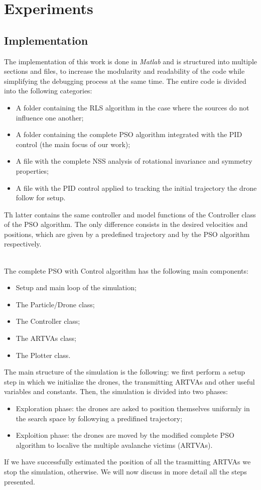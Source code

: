 \chapter{Experiments}

\section{Implementation}
The implementation of this work is done in \textit{Matlab} and 
is structured into multiple sections and files, to increase the modularity and 
readability of the code while simplifying the debugging process at the same time. 
The entire code is divided into the following categories:
\begin{itemize}
    \item A folder containing the RLS algorithm in the case where the sources
    do not influence one another;
    \item A folder containing the complete PSO algorithm integrated with 
    the PID control (the main focus of our work);
    \item A file with the complete NSS analysis of rotational invariance
    and symmetry properties;
    \item A file with the PID control applied to tracking the initial trajectory
    the drone follow for setup.
\end{itemize}
Th latter contains the same controller and model functions of the Controller
class of the PSO algorithm. The only difference consists in the desired velocities and positions, 
which are given by a predefined trajectory and by the PSO algorithm
respectively.

\noindent
\\
The complete PSO with Control algorithm has the following main components: 
\begin{itemize}
    \item Setup and main loop of the simulation;
    \item The Particle/Drone class;
    \item The Controller class;
    \item The ARTVAs class;
    \item The Plotter class.
\end{itemize}
The main structure of the simulation is the following: 
we first perform a setup step in which we initialize the drones, 
the transmitting ARTVAs and other useful variables and constants.
Then, the simulation is divided into two phases:
\begin{itemize}
    \item Exploration phase: the drones are asked to position 
    themselves uniformly in the search space by followying a
    predifined trajectory;
    \item Exploition phase: the drones are moved by the modified complete
    PSO algorithm to localive the multiple avalanche victims (ARTVAs).
\end{itemize}
If we have successfully estimated the position of all 
the trasmitting ARTVAs we stop the simulation, otherwise. 
We will now discuss in more detail all the steps presented.

